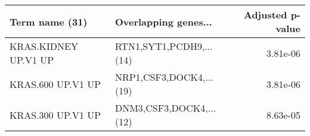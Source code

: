 \begin{tabular}{llr}
\toprule
      Term name (31) &    Overlapping genes... &  Adjusted p-value \\
\midrule
KRAS.KIDNEY UP.V1 UP & RTN1,SYT1,PCDH9,...(14) &          3.81e-06 \\
   KRAS.600 UP.V1 UP & NRP1,CSF3,DOCK4,...(19) &          3.81e-06 \\
   KRAS.300 UP.V1 UP & DNM3,CSF3,DOCK4,...(12) &          8.63e-05 \\
\bottomrule
\end{tabular}
